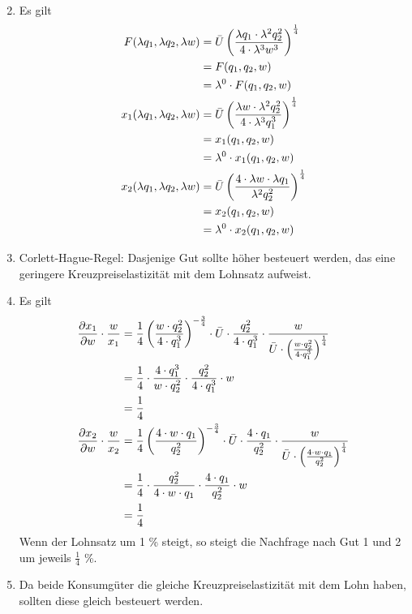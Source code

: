 \documentclass{article}
\begin{document}
\begin{enumerate}[label=(\alph*)]
\begin{align}
		\end{align}
		\item Es gilt
		\begin{align}
			F(\lambda q_1,\lambda q_2,\lambda w) &= \bar{U}\left(\frac{\lambda q_1\cdot\lambda^2 q_2^2}{4\cdot\lambda^3 w^3}\right)^\frac{1}{4} \notag \\
			&= F(q_1,q_2,w) \notag \\
			&= \lambda^0\cdot F(q_1,q_2,w) \notag \\
			x_1(\lambda q_1,\lambda q_2,\lambda w) &= \bar{U}\left(\frac{\lambda w\cdot \lambda^2 q_2^2}{4\cdot\lambda^3 q_1^3}\right)^\frac{1}{4} \notag \\
			&= x_1(q_1,q_2,w) \notag \\
			&= \lambda^0\cdot x_1(q_1,q_2,w) \notag \\
			x_2(\lambda q_1,\lambda q_2,\lambda w) &= \bar{U}\left(\frac{4\cdot \lambda w\cdot \lambda q_1}{\lambda^2 q_2^2}\right)^\frac{1}{4} \notag \\
			&= x_2(q_1,q_2,w) \notag \\
			&= \lambda^0 \cdot x_2(q_1,q_2,w) \notag
		\end{align}
		\item Corlett-Hague-Regel: Dasjenige Gut sollte höher besteuert werden, das eine geringere Kreuzpreiselastizität mit dem Lohnsatz aufweist.
		\item Es gilt
		\begin{align}
			\frac{\partial x_1}{\partial w}\cdot\frac{w}{x_1} &= \frac{1}{4}\left(\frac{w\cdot q_2^2}{4\cdot q_1^3}\right)^{-\frac{3}{4}}\cdot\bar{U}\cdot\frac{q_2^2}{4\cdot q_1^3}\cdot\frac{w}{\bar{U}\cdot\left(\frac{w\cdot q_2^2}{4\cdot q_1^3}\right)^\frac{1}{4}} \notag \\
			&= \frac{1}{4}\cdot\frac{4\cdot q_1^3}{w\cdot q_2^2}\cdot\frac{q_2^2}{4\cdot q_1^3}\cdot w \notag \\
			&= \frac{1}{4} \notag \\
			\frac{\partial x_2}{\partial w}\cdot\frac{w}{x_2} &= \frac{1}{4}\left(\frac{4\cdot w\cdot q_1}{q_2^2}\right)^{-\frac{3}{4}}\cdot\bar{U}\cdot\frac{4\cdot q_1}{q_2^2}\cdot\frac{w}{\bar{U}\cdot\left(\frac{4\cdot w\cdot q_1}{q_2^2}\right)^\frac{1}{4}} \notag \\
			&= \frac{1}{4}\cdot\frac{q_2^2}{4\cdot w\cdot q_1}\cdot\frac{4\cdot q_1}{q_2^2}\cdot w \notag \\
			&= \frac{1}{4} \notag
		\end{align}
		Wenn der Lohnsatz um 1 \% steigt, so steigt die Nachfrage nach Gut 1 und 2 um jeweils $\frac{1}{4}$ \%.
		\item Da beide Konsumgüter die gleiche Kreuzpreiselastizität mit dem Lohn haben, sollten diese gleich besteuert werden.
	\end{enumerate}
\end{document}
